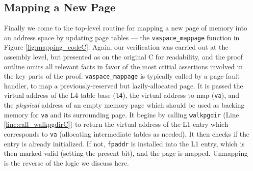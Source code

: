 \subsection{Mapping a New Page}
\label{sec:mapnewC}
Finally we come to the top-level routine for mapping a new page of memory into an address space
by updating page tables --- the \lstinline|vaspace_mappage| function in Figure \ref{fig:mapping_codeC}.
Again, our verification was carried out at the assembly level, but presented as on the original C for readability,
and the proof outline omits all relevant facts in favor of the most critial assertions involved in the key parts of the proof.
\lstinline|vaspace_mappage| is typically called by a page fault handler, to map a previously-reserved but lazily-allocated page.
It is passed the virtual address of the L4 table base (\lstinline|l4|), the virtual address to map (\lstinline|va|),
and the \emph{physical} address of an empty memory page which should be used as backing memory for \lstinline|va| and its surrounding page.
It begins by calling \lstinline|walkpgdir| (Line \ref{line:call_walkpgdirC}) to return the virtual address of 
the L1 entry which corresponds to \lstinline|va| (allocating intermediate tables as needed).
It then checks if the entry is already initialized. If not, \lstinline|fpaddr| is installed
into the L1 entry, which is then marked valid (setting the present bit), and the page is mapped.
Unmapping is the reverse of the logic we discuss here.
